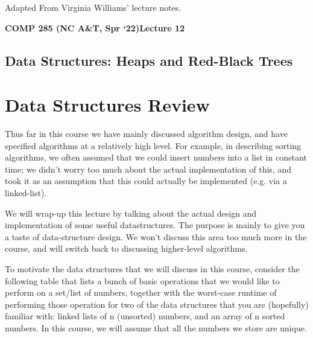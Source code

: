 \documentclass [12pt]{article}
\begin{document}
 

\vspace {1em} 
\begin {Instruction} 
Adapted From Virginia Williams' lecture notes.
\end {Instruction}  

{\LARGE \textbf {COMP 285 (NC A\&T, Spr `22)}\hfill \textbf {Lecture 12} } 

\begin{centering}
\section*{Data Structures: Heaps and Red-Black Trees}
\end{centering}

\section{Data Structures Review}

Thus far in this course we have mainly discussed algorithm design, and have specified algorithms at a relatively high level. For example, in describing sorting algorithms, we often assumed that we could insert numbers into a list in constant time; we didn’t worry too much about the actual implementation of this, and took it as an assumption that this could actually be implemented (e.g. via a linked-list).


We will wrap-up this lecture by talking about the actual design and implementation of some useful datastructures. The purpose is mainly to give you a taste of data-structure design. We won’t discuss this area too much more in the course, and will switch back to discussing higher-level algorithms. 

To motivate the data structures that we will discuss in this course, consider the following table that lists a bunch of basic operations that we would like to perform on a set/list of numbers, together with the worst-case runtime of performing those operation for two of the data structures that you are (hopefully) familiar with: linked lists of n (unsorted) numbers, and an array of n sorted numbers. In this course, we will assume that all the numbers we store are unique.
\end{document}

